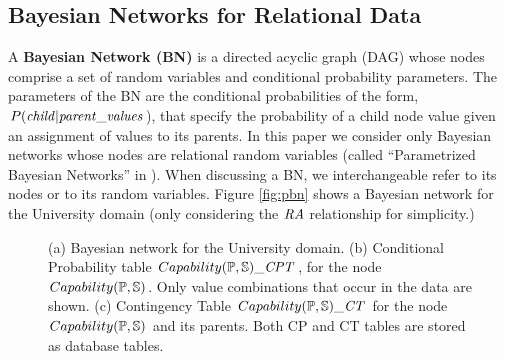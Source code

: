 \documentclass{acm_proc_article-sp}
\begin{document}
\subsection{Bayesian Networks for Relational Data}
A {\bf Bayesian Network (BN)} is a directed acyclic graph (DAG) whose nodes comprise a set of random variables and conditional probability parameters.
The parameters of the BN  
are the conditional probabilities of the form, $P(\it{child}|\it{parent\_values}$), that specify the probability of a child node value given an assignment of values to its parents. 
In this paper we consider only Bayesian networks whose nodes are relational random variables (called ``Parametrized Bayesian Networks'' in \cite{Poole2003}). When discussing a BN, we interchangeable refer to its nodes or to its random variables.
Figure \ref{fig:pbn} shows a Bayesian network for the University domain (only considering the $\ra$ relationship for simplicity.) 
\begin{figure}[htbp] %
 \centering
{} 
\caption{(a) Bayesian network for the University domain. (b) Conditional Probability table $Capability(\P,\S)\_\cptable$, for the node $Capability(\P,\S)$. Only value combinations that occur in the data are shown. (c) Contingency Table $Capability(\P,\S)\_\cttable$ for the node $Capability(\P,\S)$ and its parents. Both CP and CT tables are stored as database tables.
}
 \label{fig:pbn}
\label{fig:ct-cp-table}
\end{figure}


\end{document}
